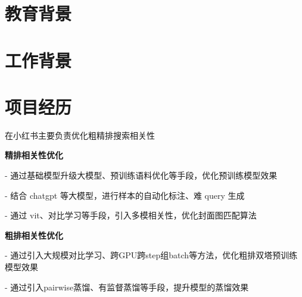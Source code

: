 \documentclass{resume}
\begin{document}
\newcommand{\SubItem}[1]{
    {\setlength\itemindent{15pt} \item[-] #1}
}




\section{\faGraduationCap  教育背景}

\section{\faUsers  工作背景}

\section{\faCogs 项目经历}
\begin{onehalfspacing}
在小红书主要负责优化粗精排搜索相关性
\begin{itemize}
\item \textbf{精排相关性优化}
\SubItem{通过基础模型升级大模型、预训练语料优化等手段，优化预训练模型效果}
\SubItem{结合 chatgpt 等大模型，进行样本的自动化标注、难 query 生成}
\SubItem{通过 vit、对比学习等手段，引入多模相关性，优化封面图匹配算法}
\item \textbf{粗排相关性优化} 
\SubItem{通过引入大规模对比学习、跨GPU跨step组batch等方法，优化粗排双塔预训练模型效果}
\SubItem{通过引入pairwise蒸馏、有监督蒸馏等手段，提升模型的蒸馏效果}
\end{itemize}
\end{onehalfspacing}
\end{document}
